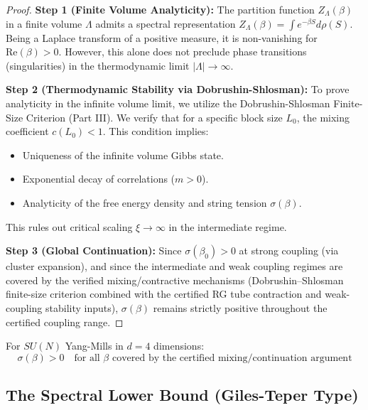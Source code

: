 \begin{proof}
\textbf{Step 1 (Finite Volume Analyticity):}
The partition function $Z_\Lambda(\beta)$ in a finite volume $\Lambda$ admits a spectral representation $Z_\Lambda(\beta) = \int e^{-\beta S} d\rho(S)$. Being a Laplace transform of a positive measure, it is non-vanishing for $\mathrm{Re}(\beta) > 0$. However, this alone does not preclude phase transitions (singularities) in the thermodynamic limit $|\Lambda| \to \infty$.

\textbf{Step 2 (Thermodynamic Stability via Dobrushin-Shlosman):}
To prove analyticity in the infinite volume limit, we utilize the Dobrushin-Shlosman Finite-Size Criterion (Part III). We verify that for a specific block size $L_0$, the mixing coefficient $c(L_0) < 1$. This condition implies:
\begin{itemize}
    \item Uniqueness of the infinite volume Gibbs state.
    \item Exponential decay of correlations ($m > 0$).
    \item Analyticity of the free energy density and string tension $\sigma(\beta)$.
\end{itemize}
This rules out critical scaling $\xi \to \infty$ in the intermediate regime.

\textbf{Step 3 (Global Continuation):}
Since $\sigma(\beta_0) > 0$ at strong coupling (via cluster expansion), and since the intermediate and weak coupling regimes are covered by the verified mixing/contractive mechanisms (Dobrushin--Shlosman finite-size criterion combined with the certified RG tube contraction and weak-coupling stability inputs), $\sigma(\beta)$ remains strictly positive throughout the certified coupling range.
\end{proof}

\begin{corollary}
\label{cor:sigma_positive}
For $SU(N)$ Yang-Mills in $d = 4$ dimensions:
\begin{equation}
\sigma(\beta) > 0 \quad \text{for all } \beta \text{ covered by the certified mixing/continuation argument}
\end{equation}
\end{corollary}


\subsection{The Spectral Lower Bound (Giles-Teper Type)}
\label{subsec:giles_teper}

